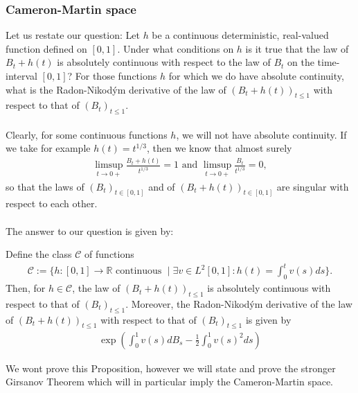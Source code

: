 \documentclass[../mainfile.tex]{subfiles}
\begin{document}
\subsubsection{Cameron-Martin space} Let us restate our question: Let $h$ be a continuous deterministic, real-valued function defined on $[0,1]$. Under what conditions on $h$ is it true that the law of $B_t + h(t)$ is absolutely continuous with respect to the law of $B_t$ on the time-interval $[0,1]$? For those functions $h$ for which we do have absolute continuity, what is the Radon-Nikodým derivative of the law of $(B_t + h(t))_{t \leq 1}$ with respect to that of $(B_t)_{t \leq 1}$. 
\\\\
Clearly, for some continuous functions $h$, we will not have absolute continuity. If we take for example $h(t)=t^{1/3}$, then we know that almost surely
\begin{align*}
\limsup_{t \to 0+} \frac{B_t+h(t)}{t^{1/3}}=1 \text{ and } \limsup_{t \to 0+} \frac{B_t}{t^{1/3}}=0,
\end{align*}
so that the laws of $(B_t)_{t \in [0,1]}$ and of $(B_t + h(t))_{t \in [0,1]}$ are singular with respect to each other. 
\\\\
The answer to our question is given by:
\begin{prop} Define the class $\mathcal{C}$ of functions 
\begin{align*}
\mathcal{C}:= \{ h:[0,1] \to \mathbb{R} \text{ continuous } \mid  \exists v \in L^2[0,1] : h(t) = \int_0^t v(s)ds \}.
\end{align*}
Then, for $h \in \mathcal{C}$, the law of $(B_t + h(t))_{t \leq 1}$ is absolutely continuous with respect to that of $(B_t)_{t \leq 1}$. Moreover, the Radon-Nikodým derivative of the law of $(B_t+h(t))_{t \leq 1}$ with respect to that of $(B_t)_{t \leq 1}$ is given by 
\begin{align*}
\exp \left( \int_0^1 v(s) d B_s - \frac{1}{2} \int_0^1 v(s)^2 ds \right) 
\end{align*}
\end{prop}
We wont prove this Proposition, however we will state and prove the stronger Girsanov Theorem which will in particular imply the Cameron-Martin space. 
\newpage
\end{document}
